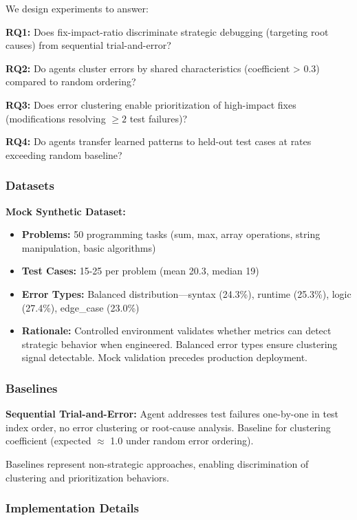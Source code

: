 
We design experiments to answer:

\textbf{RQ1:} Does fix-impact-ratio discriminate strategic debugging (targeting root causes) from sequential trial-and-error?

\textbf{RQ2:} Do agents cluster errors by shared characteristics (coefficient > 0.3) compared to random ordering?

\textbf{RQ3:} Does error clustering enable prioritization of high-impact fixes (modifications resolving $\geq 2$ test failures)?

\textbf{RQ4:} Do agents transfer learned patterns to held-out test cases at rates exceeding random baseline?

\subsubsection{Datasets}

\textbf{Mock Synthetic Dataset:}
\begin{itemize}
\item \textbf{Problems:} 50 programming tasks (sum, max, array operations, string manipulation, basic algorithms)
\item \textbf{Test Cases:} 15-25 per problem (mean 20.3, median 19)
\item \textbf{Error Types:} Balanced distribution---syntax (24.3\%), runtime (25.3\%), logic (27.4\%), edge\_case (23.0\%)
\item \textbf{Rationale:} Controlled environment validates whether metrics can detect strategic behavior when engineered. Balanced error types ensure clustering signal detectable. Mock validation precedes production deployment.
\end{itemize}

\subsubsection{Baselines}

\textbf{Sequential Trial-and-Error:} Agent addresses test failures one-by-one in test index order, no error clustering or root-cause analysis. Baseline for clustering coefficient (expected $\approx$ 1.0 under random error ordering).

Baselines represent non-strategic approaches, enabling discrimination of clustering and prioritization behaviors.

\subsubsection{Implementation Details}

